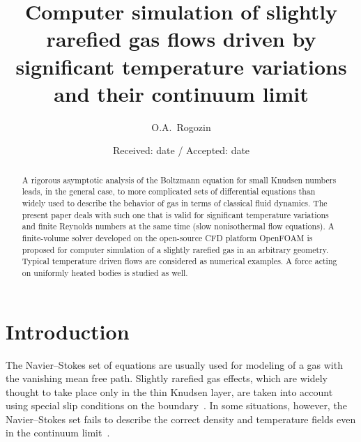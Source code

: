 \documentclass[smallextended]{svjour3} %
\begin{document}
\title{
    Computer simulation of slightly rarefied gas flows driven by significant temperature variations and their continuum limit
}

\author{O.A.~Rogozin}

\date{Received: date / Accepted: date}

\maketitle

\begin{abstract}
    A rigorous asymptotic analysis of the Boltzmann equation for small Knudsen numbers
    leads, in the general case, to more complicated sets of differential equations
    than widely used to describe the behavior of gas in terms of classical fluid dynamics.
    The present paper deals with such one that is valid for significant temperature variations
    and finite Reynolds numbers at the same time (slow nonisothermal flow equations).
    A finite-volume solver developed on the open-source CFD platform OpenFOAM\textregistered{}
    is proposed for computer simulation of a slightly rarefied gas in an arbitrary geometry.
    Typical temperature driven flows are considered as numerical examples.
    A force acting on uniformly heated bodies is studied as well.
\end{abstract}

\section{Introduction}

The Navier--Stokes set of equations are usually used for modeling of a gas with the vanishing mean free path.
Slightly rarefied gas effects, which are widely thought to take place only in the thin Knudsen layer,
are taken into account using special slip conditions on the boundary~\cite{SharipovCoefficients}.
In some situations, however, the Navier--Stokes set fails to describe the correct density
and temperature fields even in the continuum limit~\cite{Kogan1976}.
\end{document}
